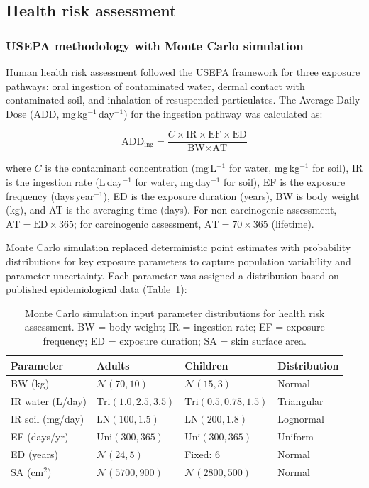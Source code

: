\documentclass[preprint,12pt,number]{elsarticle}
\begin{document}
\subsection{Health risk assessment}

\subsubsection{USEPA methodology with Monte Carlo simulation}

Human health risk assessment followed the USEPA \cite{USEPA2011} framework for three exposure pathways: oral ingestion of contaminated water, dermal contact with contaminated soil, and inhalation of resuspended particulates. The Average Daily Dose (ADD, mg\,kg$^{-1}$\,day$^{-1}$) for the ingestion pathway was calculated as:

\begin{equation}
\text{ADD}_\text{ing} = \frac{C \times \text{IR} \times \text{EF} \times \text{ED}}{\text{BW} \times \text{AT}}
\label{eq:add}
\end{equation}

\noindent where $C$ is the contaminant concentration (mg\,L$^{-1}$ for water, mg\,kg$^{-1}$ for soil), IR is the ingestion rate (L\,day$^{-1}$ for water, mg\,day$^{-1}$ for soil), EF is the exposure frequency (days\,year$^{-1}$), ED is the exposure duration (years), BW is body weight (kg), and AT is the averaging time (days). For non-carcinogenic assessment, $\text{AT} = \text{ED} \times 365$; for carcinogenic assessment, $\text{AT} = 70 \times 365$ (lifetime).

Monte Carlo simulation replaced deterministic point estimates with probability distributions for key exposure parameters to capture population variability and parameter uncertainty. Each parameter was assigned a distribution based on published epidemiological data (Table~\ref{tab:mc_params}):

\begin{table}[h!]
\centering
\caption{Monte Carlo simulation input parameter distributions for health risk assessment. BW = body weight; IR = ingestion rate; EF = exposure frequency; ED = exposure duration; SA = skin surface area.}
\label{tab:mc_params}
\small
\begin{tabular}{llll}
\toprule
Parameter & Adults & Children & Distribution \\
\midrule
BW (kg) & $\mathcal{N}(70, 10)$ & $\mathcal{N}(15, 3)$ & Normal \\
IR water (L/day) & $\text{Tri}(1.0, 2.5, 3.5)$ & $\text{Tri}(0.5, 0.78, 1.5)$ & Triangular \\
IR soil (mg/day) & $\text{LN}(100, 1.5)$ & $\text{LN}(200, 1.8)$ & Lognormal \\
EF (days/yr) & $\text{Uni}(300, 365)$ & $\text{Uni}(300, 365)$ & Uniform \\
ED (years) & $\mathcal{N}(24, 5)$ & Fixed: 6 & Normal \\
SA (cm$^{2}$) & $\mathcal{N}(5700, 900)$ & $\mathcal{N}(2800, 500)$ & Normal \\
\bottomrule
\end{tabular}
\end{table}
\end{document}
